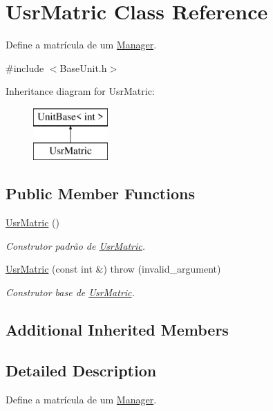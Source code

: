 \hypertarget{classUsrMatric}{\section{Usr\-Matric Class Reference}
\label{d4/d69/classUsrMatric}
}


Define a matrícula de um \hyperlink{classManager}{Manager}.  




{\ttfamily \#include $<$Base\-Unit.\-h$>$}

Inheritance diagram for Usr\-Matric\-:\begin{figure}[H]
\begin{center}
\leavevmode
\includegraphics[height=2.000000cm]{d4/d69/classUsrMatric}
\end{center}
\end{figure}
\subsection*{Public Member Functions}
\begin{DoxyCompactItemize}
\item 
\hyperlink{classUsrMatric_afbc07d30168283743b0c9c5d690dac5f}{Usr\-Matric} ()
\begin{DoxyCompactList}\small\item\em Construtor padrão de \hyperlink{classUsrMatric}{Usr\-Matric}. \end{DoxyCompactList}\item 
\hyperlink{classUsrMatric_acc7320dcfc8978fe9cc142340adb99c1}{Usr\-Matric} (const int \&)  throw (invalid\-\_\-argument)
\begin{DoxyCompactList}\small\item\em Construtor base de \hyperlink{classUsrMatric}{Usr\-Matric}. \end{DoxyCompactList}\end{DoxyCompactItemize}
\subsection*{Additional Inherited Members}


\subsection{Detailed Description}
Define a matrícula de um \hyperlink{classManager}{Manager}. 

